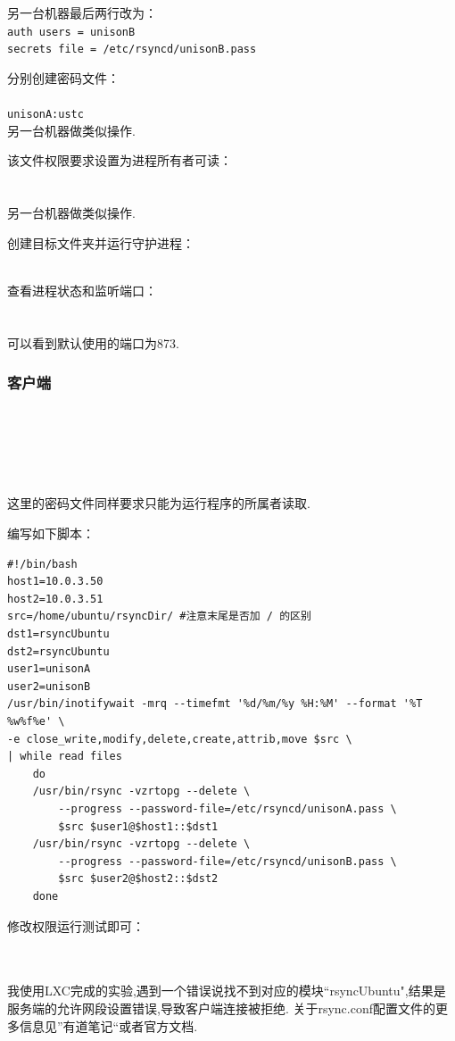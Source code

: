 另一台机器最后两行改为：\\
\texttt{auth users = unisonB}\\
\texttt{secrets file = /etc/rsyncd/unisonB.pass}

\par
分别创建密码文件：\\
\\
\texttt{unisonA:ustc}\\
另一台机器做类似操作.

\par
该文件权限要求设置为进程所有者可读：\\
\\
\\
另一台机器做类似操作.

\par
创建目标文件夹并运行守护进程：\\
\\

\par
查看进程状态和监听端口：\\
\\
 \\
可以看到默认使用的端口为873.

\subsubsection{客户端}
\\
\\
\\
\\
\\
这里的密码文件同样要求只能为运行程序的所属者读取.

编写如下脚本：\\
\begin{verbatim}
#!/bin/bash
host1=10.0.3.50
host2=10.0.3.51
src=/home/ubuntu/rsyncDir/ #注意末尾是否加 / 的区别
dst1=rsyncUbuntu
dst2=rsyncUbuntu
user1=unisonA
user2=unisonB
/usr/bin/inotifywait -mrq --timefmt '%d/%m/%y %H:%M' --format '%T %w%f%e' \ 
-e close_write,modify,delete,create,attrib,move $src \
| while read files
    do
    /usr/bin/rsync -vzrtopg --delete \
        --progress --password-file=/etc/rsyncd/unisonA.pass \
        $src $user1@$host1::$dst1
    /usr/bin/rsync -vzrtopg --delete \
        --progress --password-file=/etc/rsyncd/unisonB.pass \
        $src $user2@$host2::$dst2
    done
\end{verbatim}

修改权限运行测试即可：\\
\shell{chmod +x rsync.sh}\\
\\

\par
我使用LXC完成的实验,遇到一个错误说找不到对应的模块``rsyncUbuntu",结果是服务端的允许网段设置错误,导致客户端连接被拒绝. 关于rsync.conf配置文件的更多信息见”有道笔记“或者官方文档. 